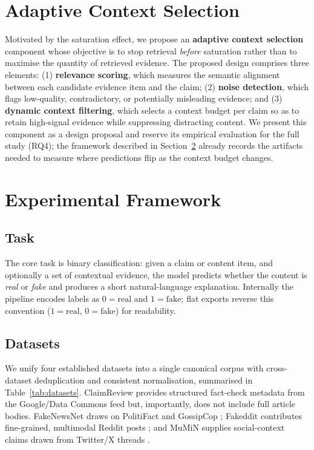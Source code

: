 \documentclass[11pt]{article}
\begin{document}
\section{Adaptive Context Selection}
\label{sec:adaptive}

Motivated by the saturation effect, we propose an \textbf{adaptive context selection} component whose objective is to stop retrieval \emph{before} saturation rather than to maximise the quantity of retrieved evidence. The proposed design comprises three elements: (1) \textbf{relevance scoring}, which measures the semantic alignment between each candidate evidence item and the claim; (2) \textbf{noise detection}, which flags low-quality, contradictory, or potentially misleading evidence; and (3) \textbf{dynamic context filtering}, which selects a context budget per claim so as to retain high-signal evidence while suppressing distracting content. We present this component as a design proposal and reserve its empirical evaluation for the full study (RQ4); the framework described in Section~\ref{sec:experiments} already records the artifacts needed to measure where predictions flip as the context budget changes.

\section{Experimental Framework}
\label{sec:experiments}

\subsection{Task}
The core task is binary classification: given a claim or content item, and optionally a set of contextual evidence, the model predicts whether the content is \emph{real} or \emph{fake} and produces a short natural-language explanation. Internally the pipeline encodes labels as $0=\text{real}$ and $1=\text{fake}$; flat exports reverse this convention ($1=\text{real}$, $0=\text{fake}$) for readability.

\subsection{Datasets}
We unify four established datasets into a single canonical corpus with cross-dataset deduplication and consistent normalisation, summarised in Table~\ref{tab:datasets}. ClaimReview provides structured fact-check metadata from the Google/Data Commons feed but, importantly, does not include full article bodies. FakeNewsNet draws on PolitiFact and GossipCop \citep{shu2020fakenewsnet}; Fakeddit contributes fine-grained, multimodal Reddit posts \citep{nakamura2020fakeddit}; and MuMiN supplies social-context claims drawn from Twitter/X threads \citep{nielsen2022mumin}.
\end{document}

